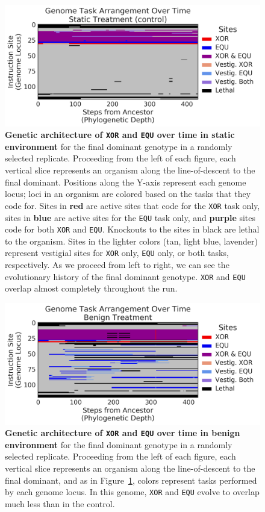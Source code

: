 \documentclass[10pt,letterpaper,final]{article}
\begin{document}
	\begin{figure}[!h]
	\includegraphics[width=0.95\columnwidth]{figures/CE/control__whole_taskmap.png}
	\caption{\textbf{Genetic architecture of \texttt{XOR} and \texttt{EQU} over time in static environment} for the final dominant genotype in a randomly selected replicate. Proceeding from the left of each figure, each vertical slice represents an organism along the line-of-descent to the final dominant.
	Positions along the Y-axis represent each genome locus; loci in an organism are colored based on the tasks that they code for. Sites in \textbf{red} are active sites that code for the \texttt{XOR} task only, sites in \textbf{blue} are active sites for the \texttt{EQU} task only, and \textbf{purple} sites code for both \texttt{XOR} and \texttt{EQU}. Knockouts to the sites in black are lethal to the organism. Sites in the lighter colors (tan, light blue, lavender) represent vestigial sites for \texttt{XOR} only, \texttt{EQU} only, or both tasks, respectively. As we proceed from left to right, we can see the evolutionary history of the final dominant genotype. \texttt{XOR} and \texttt{EQU} overlap almost completely throughout the run.}
	\label{fig:lineage-control}
	\end{figure}

	\begin{figure}[!h]
	\includegraphics[width=0.95\columnwidth]{figures/CE/benign__whole_taskmap.png}
	\caption{\textbf{Genetic architecture of \texttt{XOR} and \texttt{EQU} over time in benign environment} for the final dominant genotype in a randomly selected replicate. Proceeding from the left of each figure, each vertical slice represents an organism along the line-of-descent to the final dominant, and as in Figure~\ref{fig:lineage-control}, colors represent tasks performed by each genome locus. In this genome, \texttt{XOR} and \texttt{EQU} evolve to overlap much less than in the control.}
	\label{fig:lineage-benign}
	\end{figure}
\end{document}
